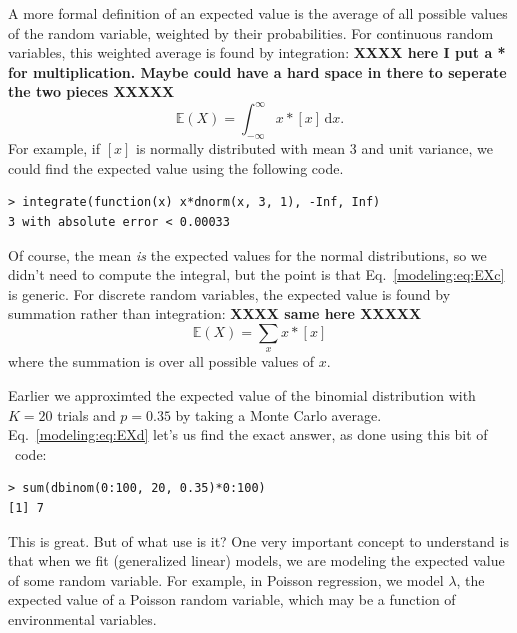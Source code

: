 A more formal definition of an expected value is the average of all
possible values of the random variable, weighted by their
probabilities. For continuous random variables, this weighted average
is found by integration: {\bf XXXX here I put a * for
  multiplication. Maybe could have a hard space in there to seperate
  the two pieces XXXXX}
\begin{equation}
  \mathbb{E}(X) = \int_{-\infty}^{\infty} x * [x] \, \text{d}{x}.
  \label{modeling:eq:EXc}
\end{equation}
For example, if $[x]$ is normally distributed with mean 3 and unit
variance, we could find the expected value using the following code.
\begin{verbatim}
> integrate(function(x) x*dnorm(x, 3, 1), -Inf, Inf)
3 with absolute error < 0.00033
\end{verbatim}
Of course, the mean \textit{is} the expected values for the normal
distributions, so we didn't need to compute the integral, but the
point is that Eq.~\ref{modeling:eq:EXc} is generic. For discrete
random variables, the expected value is found by summation rather than
integration: {\bf XXXX same here XXXXX}
\begin{equation}
  \mathbb{E}(X) = \sum_{x} x * [x]
  \label{modeling:eq:EXd}
\end{equation}
where the summation is over all possible values of $x$.

Earlier we
approximted the expected value of the binomial distribution
with $K=20$ trials and $p=0.35$ by taking a Monte Carlo
average. Eq.~\ref{modeling:eq:EXd} let's us
find the exact answer, as done using this bit of \R~code:
\begin{verbatim}
> sum(dbinom(0:100, 20, 0.35)*0:100)
[1] 7
\end{verbatim}
This is great. But of what use is it? One very
important concept to understand is that when we fit (generalized
linear) models, we are modeling the expected value of some random
variable. For example, in Poisson regression, we model $\lambda$, the
expected value of a Poisson random variable, which may be a function
of environmental variables.

